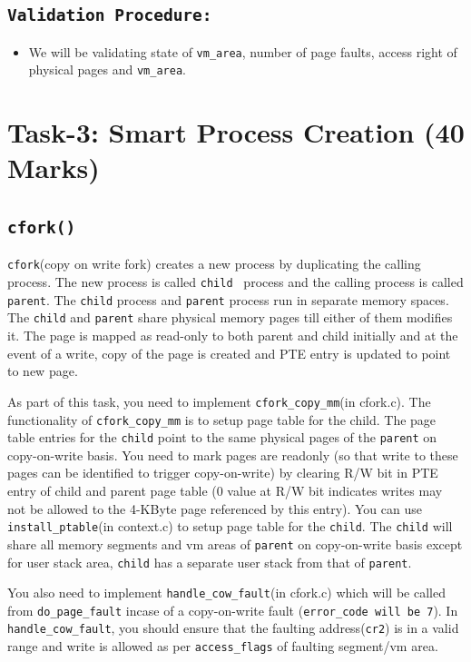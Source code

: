 \documentclass[12pt]{article}
\begin{document}
\subsection*{\tt Validation Procedure:}
     \begin{itemize}
        \item We will be validating state of {\tt vm\_area}, number of page faults, access right of physical pages and {\tt vm\_area}.
        \end{itemize}
        
\newpage

\section*{Task-3: Smart Process Creation (40 Marks)}

\subsection*{\tt cfork()}
{\tt cfork}(copy on write fork) creates a new process by duplicating the calling process. The new process is called {\tt child } process and the calling process is called {\tt parent}. The {\tt child} process and {\tt parent} process run in separate memory spaces. The {\tt child} and {\tt parent} share physical memory pages till either of them modifies it. The page is mapped as read-only to both parent and child initially and at the event of a write, copy of the page is created and PTE entry is updated to point to new page.

 
As part of this task, you need to implement {\tt cfork\_copy\_mm}(in cfork.c). The functionality of {\tt cfork\_copy\_mm} is to setup page table for the child. The page table entries for the {\tt child} point to the same physical pages of the {\tt parent} on copy-on-write basis. You need to mark pages are readonly (so that write to these pages can be identified to trigger copy-on-write) by clearing R/W bit in PTE entry of child and parent page table (0 value at R/W bit indicates writes may not be allowed to the 4-KByte page referenced by this entry). You can use {\tt install\_ptable}(in context.c) to setup page table for the {\tt child}. The {\tt child} will share all memory segments and vm areas of {\tt parent} on copy-on-write basis except for user stack area, {\tt child} has a separate user stack from that of {\tt parent}.

You also need to implement {\tt handle\_cow\_fault}(in cfork.c) which will be called from {\tt do\_page\_fault} incase of a copy-on-write fault ({\tt error\_code will be 7}). In {\tt handle\_cow\_fault}, you should ensure that the faulting address({\tt cr2}) is in a valid range and write is allowed as per {\tt access\_flags} of faulting segment/vm area. 
\end{document}
